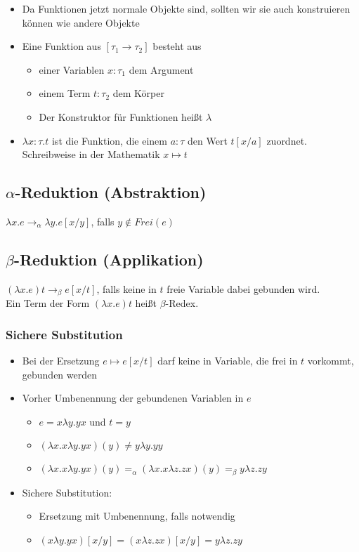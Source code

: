 \documentclass{scrartcl}
\begin{document}
\begin{itemize}
	\item Da Funktionen jetzt normale Objekte sind, sollten wir sie auch konstruieren können wie andere Objekte
	\item Eine Funktion aus $ [\tau_1 \rightarrow \tau_2] $ besteht aus
	\begin{itemize}
		\item einer Variablen $ x : \tau_1 $ dem Argument
		\item einem Term $ t : \tau_2 $ dem Körper
		\item Der Konstruktor für Funktionen heißt $ \lambda $
	\end{itemize}
	\item $ \lambda x : \tau . t $ ist die Funktion, die einem $ a : \tau $ den Wert $ t[x/a] $ zuordnet. Schreibweise in der Mathematik $ x \mapsto t $
\end{itemize}

\subsection{$ \alpha $-Reduktion (Abstraktion)}

$ \lambda x.e \rightarrow_\alpha \lambda y.e[x/y] $, falls $ y \not \in Frei(e) $

\subsection{$ \beta $-Reduktion (Applikation)}

$ (\lambda x.e) t \rightarrow_\beta e[x/t] $, falls keine in $ t $ freie Variable dabei gebunden wird. \\

Ein Term der Form $ (\lambda x.e) t $ heißt $ \beta $-Redex.

\subsubsection{Sichere Substitution}

\begin{itemize}
	\item Bei der Ersetzung $ e \mapsto e[x/t] $ darf keine in Variable, die frei in $ t $ vorkommt, gebunden werden
	\item Vorher Umbenennung der gebundenen Variablen in $ e $
	\begin{itemize}
		\item $ e = x \lambda y.y x $ und $ t = y $
		\item $ (\lambda x.x \lambda y.y x)(y) \neq y \lambda y.y y $
		\item $ (\lambda x.x \lambda y.y x)(y) =_\alpha (\lambda x.x \lambda z.z x)(y) =_\beta y \lambda z.z y $
	\end{itemize}
	\item Sichere Substitution:
	\begin{itemize}
		\item Ersetzung mit Umbenennung, falls notwendig
		\item $ (x \lambda y.y x)[x/y] = (x \lambda z.z x)[x/y] = y \lambda z.z y $
	\end{itemize}
\end{itemize}
\end{document}
